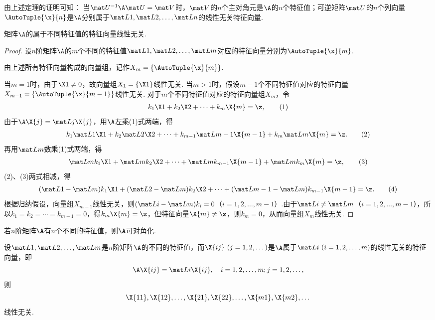 由上述定理的证明可知：
{\color{red}当\(\P^{-1}\A\P=\V\)时，\(\V\)的\(n\)个主对角元是\(\A\)的\(n\)个特征值；可逆矩阵\(\P\)的\(n\)个列向量\(\AutoTuple{\x}{n}\)是\(\A\)分别属于\(\L{1},\L{2},\dotsc,\L{n}\)的线性无关特征向量.}

\begin{theorem}
矩阵\(\A\)的属于不同特征值的特征向量线性无关.
\begin{proof}
设\(n\)阶矩阵\(\A\)的\(m\)个不同的特征值\(\L{1},\L{2},\dotsc,\L{m}\)对应的特征向量分别为\(\AutoTuple{\x}{m}\).

由上述所有特征向量构成的向量组，记作\(X_m=\{\AutoTuple{\x}{m}\}\).

当\(m=1\)时，由于\(\X1 \neq 0\)，故向量组\(X_1=\{\X1\}\)线性无关.
当\(m>1\)时，假设\(m-1\)个不同特征值对应的特征向量\(X_{m-1}=\{\AutoTuple{\x}{m-1}\}\)线性无关.
对于\(m\)个不同特征值对应的特征向量组\(X_m\)，令\begin{gather}
k_1\X1+k_2\X2+\dotsb+k_m\X{m}=\z, \tag1
\end{gather}由于\(\A\X{j}=\L{j}\X{j}\)，用\(\A\)左乘(1)式两端，得\begin{gather}
k_1\L{1}\X1+k_2\L{2}\X2+\dotsb+k_{m-1}\L{m-1}\X{m-1}+k_m\L{m}\X{m}=\z. \tag2
\end{gather}再用\(\L{m}\)数乘(1)式两端，得\begin{gather}
\L{m}k_1\X1+\L{m}k_2\X2+\dotsb+\L{m}k_{m-1}\X{m-1}+\L{m}k_m\X{m}=\z, \tag3
\end{gather}(2)、(3)两式相减，得\begin{gather}
(\L{1}-\L{m})k_1\X1+(\L{2}-\L{m})k_2\X2+\dotsb+(\L{m-1}-\L{m})k_{m-1}\X{m-1}=\z. \tag4
\end{gather}根据归纳假设，向量组\(X_{m-1}\)线性无关，则\((\L{i}-\L{m})k_i=0\)（\(i=1,2,\dotsc,m-1\)）.由于\(\L{i}\neq\L{m}\)（\(i=1,2,\dotsc,m-1\)），所以\(k_1=k_2=\dotsb=k_{m-1}=0\)，得\(k_m\X{m}=\z\)，但特征向量\(\X{m}\neq\z\)，则\(k_m=0\)，从而向量组\(X_m\)线性无关.
\end{proof}
\end{theorem}

\begin{corollary}[矩阵可对角化的充分条件]
若\(n\)阶矩阵\(\A\)有\(n\)个不同的特征值，则\(\A\)可对角化.
\end{corollary}

\begin{theorem}
设\(\L{1},\L{2},\dotsc,\L{m}\)是\(n\)阶矩阵\(\A\)的不同的特征值，而\(\X{ij}\ (j=1,2,\dotsc)\)是\(\A\)属于\(\L{i}\ (i=1,2,\dotsc,m)\)的线性无关的特征向量，即\[
\A \X{ij} = \L{i} \X{ij},
\quad i=1,2,\dotsc,m;j=1,2,\dotsc,
\]则\[
\X{11},\X{12},\dotsc,\X{21},\X{22},\dotsc,\X{m1},\X{m2},\dotsc
\]线性无关.
\end{theorem}

